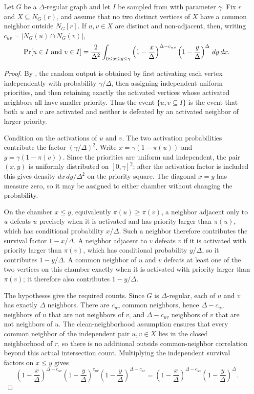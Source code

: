 \begin{helper}
Let $G$ be a $\Delta$-regular graph and let $I$ be sampled from
 with parameter $\gamma$.  Fix
$r$ and $X\subseteq N_G(r)$, and assume that no two distinct vertices of
$X$ have a common neighbor outside $N_G[r]$.  If $u,v\in X$ are distinct
and non-adjacent, then, writing
$c_{uv}=|N_G(u)\cap N_G(v)|$,
\[
\Pr[u\in I\hbox{ and }v\in I]
=
\frac{2}{\Delta^2}
\int_{0\le x\le y\le\gamma}
\left(1-\frac{x}{\Delta}\right)^{\Delta-c_{uv}}
\left(1-\frac{y}{\Delta}\right)^\Delta\,dy\,dx .
\]
\end{helper}
\begin{proof}
By , the random output is obtained by
first activating each vertex independently with probability $\gamma/\Delta$,
then assigning independent uniform priorities, and then retaining exactly the
activated vertices whose activated neighbors all have smaller priority.  Thus
the event $\{u,v\subseteq I\}$ is the event that both $u$ and $v$ are
activated and neither is defeated by an activated neighbor of larger priority.

Condition on the activations of $u$ and $v$.  The two activation probabilities
contribute the factor $(\gamma/\Delta)^2$.  Write
$x=\gamma(1-\pi(u))$ and $y=\gamma(1-\pi(v))$.  Since the priorities are
uniform and independent, the pair $(x,y)$ is uniformly distributed on
$[0,\gamma]^2$; after the activation factor is included this gives density
$dx\,dy/\Delta^2$ on the priority square.  The diagonal $x=y$ has measure zero,
so it may be assigned to either chamber without changing the probability.

On the chamber $x\le y$, equivalently $\pi(u)\ge\pi(v)$, a neighbor adjacent
only to $u$ defeats $u$ precisely when it is activated and has priority larger
than $\pi(u)$, which has conditional probability $x/\Delta$.  Such a neighbor
therefore contributes the survival factor $1-x/\Delta$.  A neighbor adjacent
to $v$ defeats $v$ if it is activated with priority larger than $\pi(v)$,
which has conditional probability $y/\Delta$, so it contributes
$1-y/\Delta$.  A common neighbor of $u$ and $v$ defeats at least one of the two
vertices on this chamber exactly when it is activated with priority larger
than $\pi(v)$; it therefore also contributes $1-y/\Delta$.

The hypotheses give the required counts.  Since $G$ is $\Delta$-regular,
each of $u$ and $v$ has exactly $\Delta$ neighbors.  There are
$c_{uv}$ common neighbors, hence $\Delta-c_{uv}$ neighbors of $u$ that are not
neighbors of $v$, and $\Delta-c_{uv}$ neighbors of $v$ that are not neighbors
of $u$.  The clean-neighborhood assumption ensures that every common neighbor
of the independent pair $u,v\in X$ lies in the closed neighborhood of $r$, so
there is no additional outside common-neighbor correlation beyond this actual
intersection count.  Multiplying the independent survival factors on
$x\le y$ gives
\[
\left(1-\frac{x}{\Delta}\right)^{\Delta-c_{uv}}
\left(1-\frac{y}{\Delta}\right)^{c_{uv}}
\left(1-\frac{y}{\Delta}\right)^{\Delta-c_{uv}}
=
\left(1-\frac{x}{\Delta}\right)^{\Delta-c_{uv}}
\left(1-\frac{y}{\Delta}\right)^\Delta .
\]


\end{proof}
